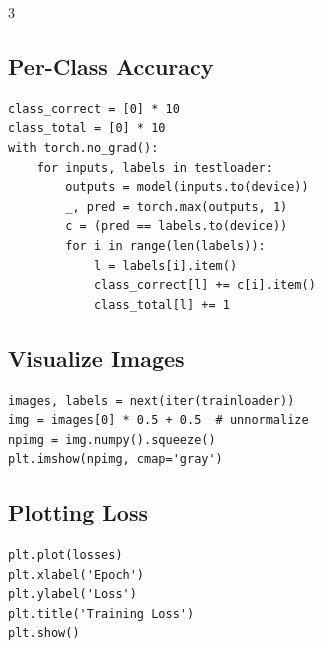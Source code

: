 \documentclass[6pt,landscape,a4paper]{extarticle}
\begin{document}
\begin{multicols}{3}
\subsection{Per-Class Accuracy}
\begin{lstlisting}
class_correct = [0] * 10
class_total = [0] * 10
with torch.no_grad():
    for inputs, labels in testloader:
        outputs = model(inputs.to(device))
        _, pred = torch.max(outputs, 1)
        c = (pred == labels.to(device))
        for i in range(len(labels)):
            l = labels[i].item()
            class_correct[l] += c[i].item()
            class_total[l] += 1
\end{lstlisting}

\subsection{Visualize Images}
\begin{lstlisting}
images, labels = next(iter(trainloader))
img = images[0] * 0.5 + 0.5  # unnormalize
npimg = img.numpy().squeeze()
plt.imshow(npimg, cmap='gray')
\end{lstlisting}

\subsection{Plotting Loss}
\begin{lstlisting}
plt.plot(losses)
plt.xlabel('Epoch')
plt.ylabel('Loss')
plt.title('Training Loss')
plt.show()
\end{lstlisting}

\end{multicols}
\end{document}
